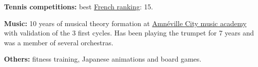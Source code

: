 \documentclass[12pt,a4paper]{article} %
\begin{document}
\spacedhrule{1.6em}{-0.4em} %



\inlineheadsection %
{\textbf{Tennis competitions:}} 
{best {\href{http://www.lequipe.fr/Ilosport/Archives/Actualites/Comprendre-le-classement-francais/742514}{French ranking}}: 15.}

\inlineheadsection
{\textbf{Music:}}
{10 years of musical theory formation at {\href{http://www.amneville-les-thermes.com/le-conservatoire-de-musique-et-de-danse}{Amnéville City music academy}} with validation of the 3 first cycles. Has been playing the trumpet for 7 years and was a member of several orchestras.}

\inlineheadsection
{\textbf{Others:}}
{fitness training, Japanese animations and board games.}

\end{document}
